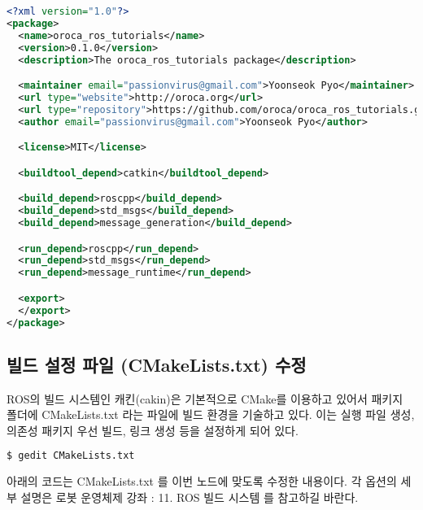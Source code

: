 \begin{lstlisting}[language=XML]
<?xml version="1.0"?>
<package>
  <name>oroca_ros_tutorials</name>
  <version>0.1.0</version>
  <description>The oroca_ros_tutorials package</description>

  <maintainer email="passionvirus@gmail.com">Yoonseok Pyo</maintainer>
  <url type="website">http://oroca.org</url>
  <url type="repository">https://github.com/oroca/oroca_ros_tutorials.git</url>
  <author email="passionvirus@gmail.com">Yoonseok Pyo</author>

  <license>MIT</license>

  <buildtool_depend>catkin</buildtool_depend>

  <build_depend>roscpp</build_depend>
  <build_depend>std_msgs</build_depend>
  <build_depend>message_generation</build_depend>

  <run_depend>roscpp</run_depend>
  <run_depend>std_msgs</run_depend>
  <run_depend>message_runtime</run_depend>

  <export>
  </export>
</package>
\end{lstlisting}

\subsection{빌드 설정 파일 (CMakeLists.txt) 수정}

ROS의 빌드 시스템인 캐킨(cakin)은 기본적으로 CMake를 이용하고 있어서 패키지 폴더에 CMakeLists.txt 라는 파일에 빌드 환경을 기술하고 있다. 이는 실행 파일 생성, 의존성 패키지 우선 빌드, 링크 생성 등을 설정하게 되어 있다.

\begin{lstlisting}[language=bash]
$ gedit CMakeLists.txt 
\end{lstlisting}

아래의 코드는 CMakeLists.txt 를 이번 노드에 맞도록 수정한 내용이다. 각 옵션의 세부 설명은 로봇 운영체제 강좌 : 11. ROS 빌드 시스템 를 참고하길 바란다.

